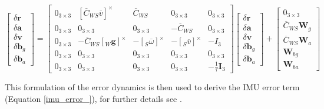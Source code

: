 \documentclass[a4paper,11pt,notitlepage]{article}
\begin{document}
\begin{equation}
\begin{bmatrix}
       \delta \textbf{\.r}  \\[0.3em]
       \delta \textbf{\.a} \\[0.3em]
       \delta \textbf{\.v} \\[0.3em]
       \delta \textbf{\.b}_{g} \\[0.3em]
       \delta \textbf{\.b}_{a}
\end{bmatrix}
=
\begin{bmatrix}
       0_{3 \times 3} &  [\overline{C}_{WS}\overline{v}]^{\times}
       & \overline{C}_{WS} &  0_{3 \times 3} &  0_{3 \times 3}\\
       
       0_{3 \times 3} & 0_{3 \times 3} 
       & 0_{3 \times 3} &  -\overline{C}_{WS} &  0_{3 \times 3}\\
       
       0_{3 \times 3} & -\overline{C}_{WS}[_{W}\textbf{g}]^{\times}
       & -[_{S}\overline{\omega}]^{\times} &  -[_{S}\overline{v}]^{\times} &  -I_{3}\\
       
       0_{3 \times 3} & 0_{3 \times 3}
       & 0_{3 \times 3} &  0_{3 \times 3} &  0_{3 \times 3}\\
       
       0_{3 \times 3} & 0_{3 \times 3} 
       & 0_{3 \times 3} &  0_{3 \times 3} &  -\frac{1}{\tau}\textbf{I}_{3}
\end{bmatrix}
\begin{bmatrix}
       \delta \textbf{r}  \\[0.3em]
       \delta \textbf{a} \\[0.3em]
       \delta \textbf{v} \\[0.3em]
       \delta \textbf{b}_{g} \\[0.3em]
       \delta \textbf{b}_{a}
\end{bmatrix}
+
\begin{bmatrix}
       0_{3 \times 3}  \\[0.3em]
       \overline{C}_{WS} \textbf{W}_{g} \\[0.3em]
       \overline{C}_{WS} \textbf{W}_{a} \\[0.3em]
       \textbf{W}_{bg} \\[0.3em]
       \textbf{W}_{ba}
\end{bmatrix}
\end{equation}
 
This formulation of the error dynamics is then used to derive the IMU error term (Equation \ref{imu_error_}), for further details see \cite{Okvis_1}.
\end{document}
